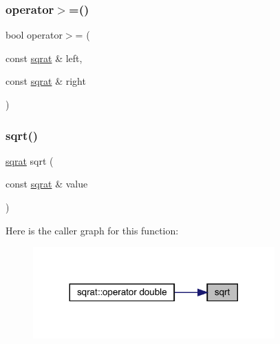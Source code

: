 \mbox{\label{adat-devel_2lib_2SU3_2sqrat_8cc_ac19a9f2479674bf8ef795d1d5d176457}} 
\subsubsection{\texorpdfstring{operator$>$=()}{operator>=()}}
{\footnotesize\ttfamily bool operator$>$= (\begin{DoxyParamCaption}\item[{const \mbox{\hyperlink{classsqrat}{sqrat}} \&}]{left,  }\item[{const \mbox{\hyperlink{classsqrat}{sqrat}} \&}]{right }\end{DoxyParamCaption})}

\mbox{\label{adat-devel_2lib_2SU3_2sqrat_8cc_a4eaa086f75083f409944caa419ec9a8b}} 
\subsubsection{\texorpdfstring{sqrt()}{sqrt()}}
{\footnotesize\ttfamily \mbox{\hyperlink{classsqrat}{sqrat}} sqrt (\begin{DoxyParamCaption}\item[{const \mbox{\hyperlink{classsqrat}{sqrat}} \&}]{value }\end{DoxyParamCaption})}

Here is the caller graph for this function\+:
\nopagebreak
\begin{figure}[H]
\begin{center}
\leavevmode
\includegraphics[width=263pt]{d5/d24/adat-devel_2lib_2SU3_2sqrat_8cc_a4eaa086f75083f409944caa419ec9a8b_icgraph}
\end{center}
\end{figure}
